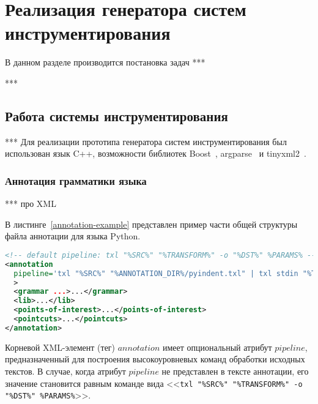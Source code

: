 \chapter{Реализация генератора систем инструментирования}

В данном разделе производится постановка задач ***

***

\section{Работа системы инструментирования}

***
Для реализации прототипа генератора систем инструментирования был использован язык C++, возможности библиотек Boost~\cite{boost}, argparse~\cite{argparse} и tinyxml2~\cite{tinyxml2}.

\subsection{Аннотация грамматики языка}

***
про XML

В листинге~\ref{annotation-example} представлен пример части общей структуры файла аннотации для языка Python.

\begin{lstlisting}[frame=single, language=XML, label={annotation-example}, caption={Пример общей структуры файла аннотации}]
<!-- default pipeline: txl "%SRC%" "%TRANSFORM%" -o "%DST%" %PARAMS% -->
<annotation
  pipeline='txl "%SRC%" "%ANNOTATION_DIR%/pyindent.txl" | txl stdin "%TRANSFORM%" -o "%DST%" %PARAMS%'
  >
  <grammar ...>...</grammar>
  <lib>...</lib>
  <points-of-interest>...</points-of-interest>
  <pointcuts>...</pointcuts>
</annotation>
\end{lstlisting}

Корневой XML-элемент (тег) $annotation$ имеет опциональный атрибут $pipeline$, предназначенный для построения высокоуровневых команд обработки исходных текстов.
В случае, когда атрибут $pipeline$ не представлен в тексте аннотации, его значение становится равным команде вида <<\lstinline{txl "%SRC%" "%TRANSFORM%" -o "%DST%" %PARAMS%}>>.

